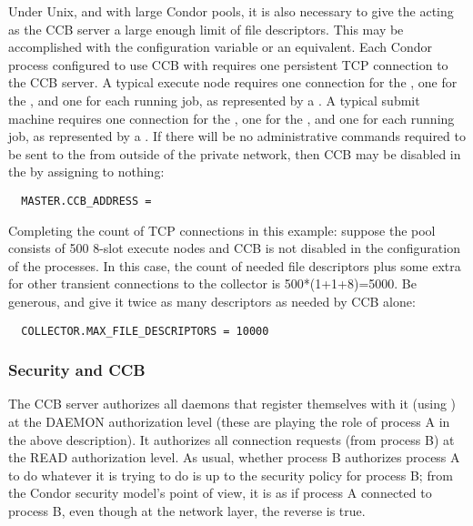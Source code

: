 Under Unix, and with large Condor pools,
it is also necessary to give the  acting as the CCB server
a large enough limit of file descriptors.
This may be accomplished with the configuration variable
 or an equivalent.
Each Condor process configured to use CCB with 
requires one persistent TCP connection to the CCB server.
A typical execute node
requires one connection for the ,
one for the ,
and one for each running job, as represented by a .
A typical submit machine
requires one connection for the ,
one for the ,
and one for each running job, as represented by a .
If there will be no administrative commands required
to be sent to the  from outside of
the private network, then CCB may be disabled in the 
by assigning  to nothing:
\begin{verbatim}
  MASTER.CCB_ADDRESS =
\end{verbatim}

Completing the count of TCP connections in this example:
suppose the pool consists of 500 8-slot
execute nodes and CCB is not disabled in the configuration of the
 processes.
In this case, the count of needed file descriptors plus some extra
for other transient connections to the collector is
500*(1+1+8)=5000.
Be generous, and give it twice as many
descriptors as needed by CCB alone:

\begin{verbatim}
  COLLECTOR.MAX_FILE_DESCRIPTORS = 10000
\end{verbatim}

\subsubsection{Security and CCB}

The CCB server authorizes all daemons that register themselves with it
(using ) at the DAEMON authorization level (these
are playing the role of process A in the above description).  It
authorizes all connection requests (from process B) at the READ
authorization level.  As usual, whether process B authorizes process A
to do whatever it is trying to do is up to the security policy for
process B; from the Condor security model's point of view, it is as if
process A connected to process B, even though at the network layer,
the reverse is true.

